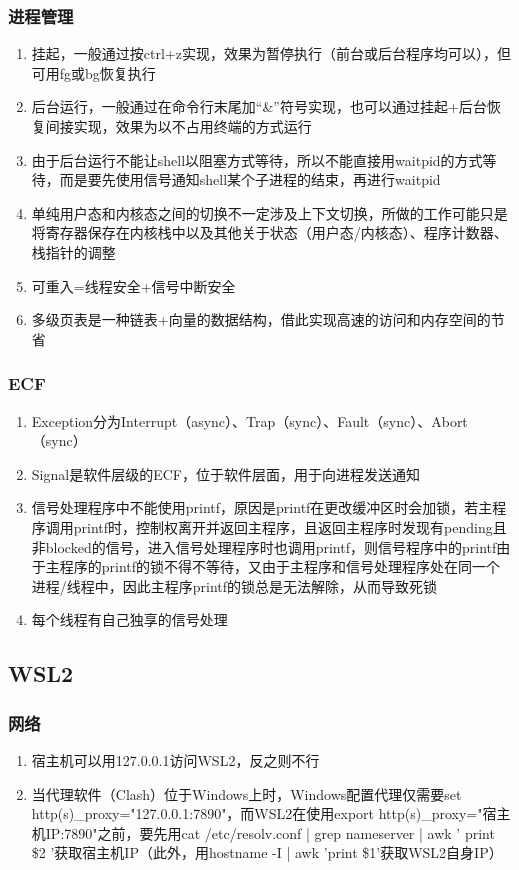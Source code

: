 \documentclass[onecolumn]{article}
\begin{document}
        \subsubsection{进程管理}
            \noindent
            \begin{enumerate}
                \item 挂起，一般通过按ctrl+z实现，效果为暂停执行（前台或后台程序均可以），但可用fg或bg恢复执行
                \item 后台运行，一般通过在命令行末尾加“\&”符号实现，也可以通过挂起+后台恢复间接实现，效果为以不占用终端的方式运行
                \item 由于后台运行不能让shell以阻塞方式等待，所以不能直接用waitpid的方式等待，而是要先使用信号通知shell某个子进程的结束，再进行waitpid
                \item 单纯用户态和内核态之间的切换不一定涉及上下文切换，所做的工作可能只是将寄存器保存在内核栈中以及其他关于状态（用户态/内核态）、程序计数器、栈指针的调整
                \item 可重入=线程安全+信号中断安全
                \item 多级页表是一种链表+向量的数据结构，借此实现高速的访问和内存空间的节省
            \end{enumerate}
        \subsubsection{ECF}
            \noindent
            \begin{enumerate}
                \item Exception分为Interrupt（async）、Trap（sync）、Fault（sync）、Abort（sync）
                \item Signal是软件层级的ECF，位于软件层面，用于向进程发送通知
                \item 信号处理程序中不能使用printf，原因是printf在更改缓冲区时会加锁，若主程序调用printf时，控制权离开并返回主程序，且返回主程序时发现有pending且非blocked的信号，进入信号处理程序时也调用printf，则信号程序中的printf由于主程序的printf的锁不得不等待，又由于主程序和信号处理程序处在同一个进程/线程中，因此主程序printf的锁总是无法解除，从而导致死锁
                \item 每个线程有自己独享的信号处理
            \end{enumerate}
    \subsection{WSL2}
        \subsubsection{网络}
            \noindent
            \begin{enumerate}
                \item 宿主机可以用127.0.0.1访问WSL2，反之则不行
                \item 当代理软件（Clash）位于Windows上时，Windows配置代理仅需要set http(s)\_proxy="127.0.0.1:7890"，而WSL2在使用export http(s)\_proxy="宿主机IP:7890"之前，要先用cat /etc/resolv.conf | grep nameserver | awk '{ print \$2 }'获取宿主机IP（此外，用hostname -I | awk '{print \$1}'获取WSL2自身IP）
            \end{enumerate}
\end{document}
